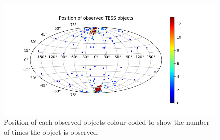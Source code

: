 \documentclass[12pt]{report}
\begin{document}
\begin{figure}[h!]
	\centering
	\includegraphics[width=\textwidth]{img/skymap_TESS_wrap.png}
	  \caption{Position of each observed objects colour-coded to show the number of times the object is observed.}	
	  \label{fig:skymap_TESS}	
\end{figure}\newpage
	  
\end{document}
